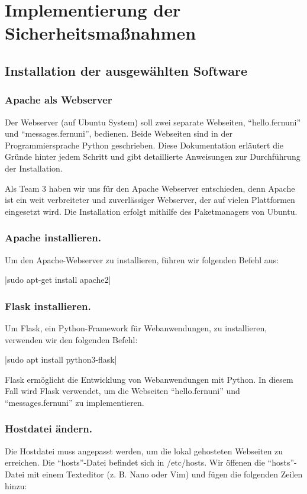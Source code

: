\section{Implementierung der Sicherheitsmaßnahmen}

\subsection{Installation der ausgewählten Software}

\subsubsection{Apache als Webserver}

Der Webserver (auf Ubuntu System) soll zwei separate Webseiten, \enquote{hello.fernuni} und \enquote{messages.fernuni}, bedienen. Beide Webseiten sind in der Programmiersprache Python geschrieben. Diese Dokumentation erläutert die Gründe hinter jedem Schritt und gibt detaillierte Anweisungen zur Durchführung der Installation.

Als Team 3 haben wir uns für den Apache Webserver entschieden, denn Apache ist ein weit verbreiteter und zuverlässiger Webserver, der auf vielen Plattformen eingesetzt wird. Die Installation erfolgt mithilfe des Paketmanagers von Ubuntu.

\subsubsection*{Apache installieren.}
Um den Apache-Webserver zu installieren, führen wir folgenden Befehl aus:

|sudo apt-get install apache2|

\subsubsection*{Flask installieren.}
Um Flask, ein Python-Framework für Webanwendungen, zu installieren, verwenden wir den folgenden Befehl:

|sudo apt install python3-flask|

Flask ermöglicht die Entwicklung von Webanwendungen mit Python. In diesem Fall wird Flask verwendet, um die Webseiten \enquote{hello.fernuni} und \enquote{messages.fernuni} zu implementieren.

\subsubsection*{Hostdatei ändern.}
Die Hostdatei muss angepasst werden, um die lokal gehosteten Webseiten zu erreichen. Die \enquote{hosts}-Datei befindet sich in /etc/hosts. Wir öffenen die \enquote{hosts}-Datei mit einem Texteditor (z. B. Nano oder Vim) und fügen die folgenden Zeilen hinzu:


